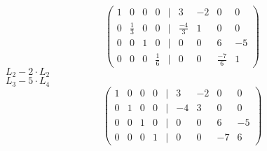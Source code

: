 \documentclass[leqno]{article}
\begin{document}
\begin{enumerate}
\begin{sol}
$$\begin{pmatrix}
	  	  	  	1 & 0 & 0 & 0 & | & 3 & -2 & 0 & 0\\
	  	  	  	0 & \frac{1}{3} & 0 & 0 & | & \frac{-4}{3} & 1 & 0 & 0\\
	  	  	  	0 & 0 & 1 & 0 & | & 0 & 0 & 6 & -5\\
	  	  	  	0 & 0 & 0 & \frac{1}{6} & | & 0 & 0 & \frac{-7}{6} & 1
	  	  	  \end{pmatrix}$$
  	  	  	  $L_2 - 2 \cdot L_2$\\
  	  	  	  $L_3 - 5 \cdot L_4$
  	  	  	  $$\begin{pmatrix}
  	  	  	  	1 & 0 & 0 & 0 & | & 3 & -2 & 0 & 0\\
  	  	  	  	0 & 1 & 0 & 0 & | & -4 & 3 & 0 & 0\\
  	  	  	  	0 & 0 & 1 & 0 & | & 0 & 0 & 6 & -5\\
  	  	  	  	0 & 0 & 0 & 1 & | & 0 & 0 & -7 & 6
  	  	  	  \end{pmatrix}$$
  	  	  

\end{sol}
\end{enumerate}
\end{document}
